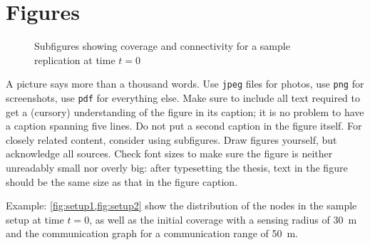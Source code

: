 \documentclass[]{ccs-thesis}
\begin{document}
{\section{Figures}

\begin{figure}%
	\centering
	\caption{Subfigures showing coverage and connectivity for a sample replication at time $t=0$}%
	\label{fig:setups12}%
\end{figure}

A picture says more than a thousand words.
Use \texttt{jpeg} files for photos, use \texttt{png} for screenshots, use \texttt{pdf} for everything else.
Make sure to include all text required to get a (cursory) understanding of the figure in its caption; it is no problem to have a caption spanning five lines.
Do not put a second caption in the figure itself.
For closely related content, consider using subfigures.
Draw figures yourself, but acknowledge all sources.
Check font sizes to make sure the figure is neither unreadably small nor overly big: after typesetting the thesis, text in the figure should be the same size as that in the figure caption.

Example: \cref{fig:setup1,fig:setup2} show the distribution of the nodes in the sample setup at time $t=0$, as well as the initial coverage with a sensing radius of \SI{30}{\metre} and the communication graph for a communication range of \SI{50}{\metre}.

}
\end{document}
